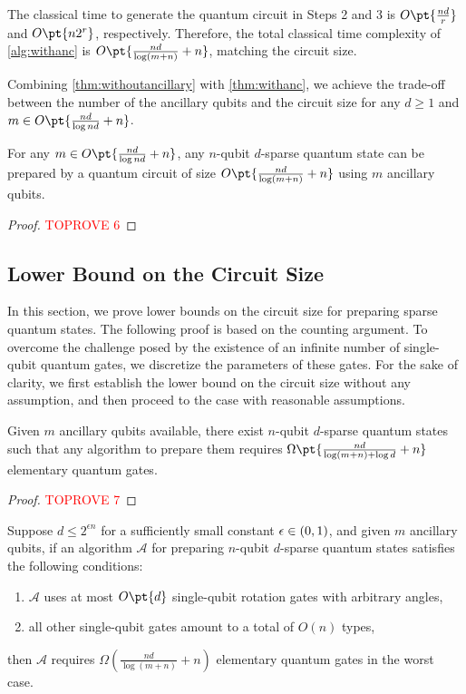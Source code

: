\documentclass[a4paper,UKenglish,cleveref, autoref, thm-restate]{lipics-v2021}
\DeclarePairedDelimiter\rbra{\lparen}{\rparen}
\newcommand{\bo}{O\pt}
\newcommand{\om}{\Omega\pt}
\begin{document}
The classical time to generate the quantum circuit in Steps 2 and 3 is $\bo{\frac{nd}{r}}$ and $\bo{n2^r}$, respectively. Therefore, the total classical time complexity of \cref{alg:withanc} is $\bo{\frac{nd}{\log (m+n)} + n}$, matching the circuit size.

Combining \cref{thm:withoutancillary} with \cref{thm:withanc}, we achieve the trade-off between the number of the ancillary qubits and the circuit size for any $d \geq 1$ and $m \in \bo{\frac{nd}{\log nd}+n}$.
\begin{theorem}
   For any $m \in \bo{\frac{nd}{\log nd}+n}$, any $n$-qubit $d$-sparse quantum state can be prepared by a quantum circuit of size $\bo{\frac{nd}{\log (m+n)} + n}$ using $m$ ancillary qubits.
\end{theorem}

\begin{proof}\textcolor{red}{TOPROVE 6}\end{proof}

\subsection{Lower Bound on the Circuit Size }

In this section, we prove  lower bounds on the circuit size  for preparing sparse quantum states. The following proof is based on the counting argument. To overcome the challenge posed by the existence of an infinite number of single-qubit quantum gates, we discretize the parameters of these gates. For the sake of clarity, we first establish the lower bound on the circuit size without any assumption, and then proceed to the case with reasonable assumptions.

\begin{theorem}\label{res:thm:lb1}
Given $m$ ancillary qubits available, there exist $n$-qubit $d$-sparse quantum states  such that any algorithm to prepare them requires $\om{\frac{nd}{\log(m + n) + \log d} + n}$ elementary quantum gates.
\end{theorem}

\begin{proof}\textcolor{red}{TOPROVE 7}\end{proof}

\begin{theorem}
    Suppose $d \leq 2^{\epsilon n}$ for a sufficiently small constant $\epsilon \in \rbra{0, 1}$, and given $m$ ancillary qubits, if an algorithm $\mathcal{A}$ for preparing $n$-qubit $d$-sparse quantum states satisfies the following conditions:
    \begin{enumerate}
        \item $\mathcal{A}$ uses at most $\bo{d}$ single-qubit rotation gates with arbitrary angles,
        \item all other single-qubit gates amount to a total of $O(n)$ types,
    \end{enumerate}
 then $\mathcal{A}$ requires $\Omega(\frac{nd}{\log(m+n)} + n)$ elementary quantum gates in the worst case.
\end{theorem}
\end{document}
